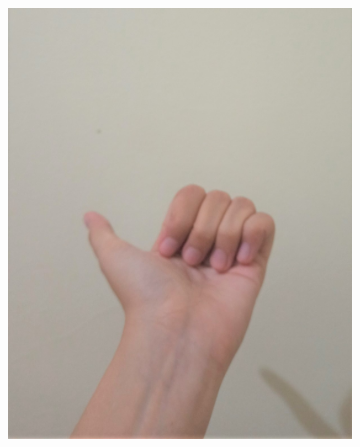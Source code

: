 \documentclass[conference]{IEEEtran}
\begin{document}
\begin{figure} [h]
\begin{center}
\begin{subfigure}[t]{0.11\textwidth}
				\includegraphics[width=\textwidth]{img/pola5a.jpg}
				\caption{\label{fig:gs5a}}
			\end{subfigure}
			\hspace{0.1em}
			\begin{subfigure}[t]{0.11\textwidth}
				\centering

\end{subfigure}
\end{center}
\end{figure}
\end{document}
